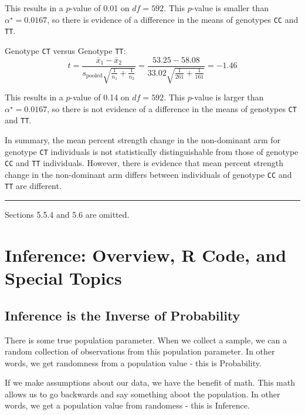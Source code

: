 \documentclass[
  letterpaper,
  DIV=11,
  numbers=noendperiod]{scrreprt}
\begin{document}
This results in a \(p\)-value of 0.01 on \(df =592\). This \(p\)-value
is smaller than \(\alpha^\star = 0.0167\), so there is evidence of a
difference in the means of genotypes \texttt{CC} and \texttt{TT}.

Genotype \texttt{CT} versus Genotype \texttt{TT}:\\
\[
t = \frac{\overline{x}_1 - \overline{x}_2}{s_{\text{pooled}}\sqrt{\frac{1}{n_1} + \frac{1}{n_2}}}
= \dfrac{53.25 - 58.08}{33.02 \sqrt{\frac{1}{261} + \frac{1}{161}}} = -1.46
\]

This results in a \(p\)-value of 0.14 on \(df =592\). This \(p\)-value
is larger than \(\alpha^\star = 0.0167\), so there is not evidence of a
difference in the means of genotypes \texttt{CT} and \texttt{TT}.

In summary, the mean percent strength change in the non-dominant arm for
genotype \texttt{CT} individuals is not statistically distinguishable
from those of genotype \texttt{CC} and \texttt{TT} individuals. However,
there is evidence that mean percent strength change in the non-dominant
arm differs between individuals of genotype \texttt{CC} and \texttt{TT}
are different.

\begin{center}\rule{0.5\linewidth}{0.5pt}\end{center}

Sections 5.5.4 and 5.6 are omitted.

\hypertarget{inference-overview-r-code-and-special-topics}{%
\chapter{Inference: Overview, R Code, and Special
Topics}\label{inference-overview-r-code-and-special-topics}}

\hypertarget{inference-is-the-inverse-of-probability}{%
\section{Inference is the Inverse of
Probability}\label{inference-is-the-inverse-of-probability}}

There is some true population parameter. When we collect a sample, we
can a random collection of observations from this population parameter.
In other words, we get randomness from a population value - this is
Probability.

If we make assumptions about our data, we have the benefit of math. This
math allows us to go backwards and say something aboot the population.
In other words, we get a population value from randomess - this is
Inference.
\end{document}
